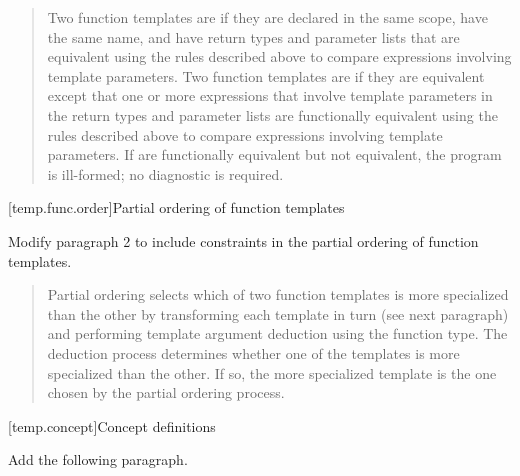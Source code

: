 \begin{quote}
\setcounter{Paras}{5}
\pnum
Two function templates are  if they are 
declared in the same scope, have the same name,
and have 
return types\added{,} and parameter lists that are 
equivalent using the rules described above to compare expressions 
involving template parameters.
% 
Two function templates are  if they 
are equivalent except that one or more expressions that involve 
template parameters in the 
return types\added{,} and parameter lists
are functionally equivalent using the rules described above to compare 
expressions involving template parameters.
% 
If 
are 
functionally equivalent but not equivalent, the program is ill-formed; 
no diagnostic is required.
\end{quote}


[temp.func.order]{Partial ordering of function templates}

Modify paragraph 2 to include constraints in the partial ordering
of function templates.

\begin{quote}
\setcounter{Paras}{1}
\pnum
Partial ordering selects which of two function templates is 
more specialized than the other by transforming each template 
in turn (see next paragraph) and performing template argument 
deduction using the function type. The deduction process 
determines whether one of the templates is more specialized 
than the other.
% 
If so, the more specialized template is the one chosen by the 
partial ordering process. 
% 
\end{quote}

[temp.concept]{Concept definitions}

Add the following paragraph.

